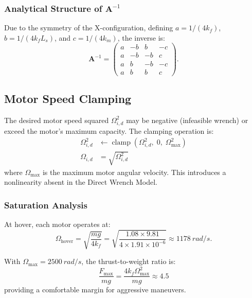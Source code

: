 \documentclass[journal]{IEEEtran}
\newcommand{\A}{\mathbf{A}}
\newcommand{\clamp}{\operatorname{clamp}}
\begin{document}
\subsubsection{Analytical Structure of $\A^{-1}$}

Due to the symmetry of the X-configuration, defining $a = 1/(4k_f)$, $b = 1/(4k_f L_s)$, and $c = 1/(4k_m)$, the inverse is:
\begin{equation}
  \A^{-1} = \begin{pmatrix}
    a & -b &  b & -c \\
    a & -b & -b &  c \\
    a &  b & -b & -c \\
    a &  b &  b &  c
  \end{pmatrix}.
  \label{eq:A_inv}
\end{equation}

\subsection{Motor Speed Clamping}

The desired motor speed squared $\Omega_{i,d}^2$ may be negative (infeasible wrench) or exceed the motor's maximum capacity. The clamping operation is:
\begin{align}
  \Omega_{i,d}^2 &\leftarrow \clamp(\Omega_{i,d}^2, \; 0, \; \Omega_{\max}^2) \label{eq:clamp_sq} \\
  \Omega_{i,d}   &= \sqrt{\Omega_{i,d}^2} \label{eq:sqrt_omega}
\end{align}
where $\Omega_{\max}$ is the maximum motor angular velocity. This introduces a nonlinearity absent in the Direct Wrench Model.

\subsubsection{Saturation Analysis}

At hover, each motor operates at:
\begin{equation}
  \Omega_{\text{hover}} = \sqrt{\frac{mg}{4 k_f}} = \sqrt{\frac{1.08 \times 9.81}{4 \times 1.91 \times 10^{-6}}} \approx \SI{1178}{rad/s}.
  \label{eq:omega_hover}
\end{equation}

With $\Omega_{\max} = \SI{2500}{rad/s}$, the thrust-to-weight ratio is:
\begin{equation}
  \frac{F_{\max}}{mg} = \frac{4 k_f \Omega_{\max}^2}{mg} \approx 4.5
  \label{eq:thrust_weight}
\end{equation}
providing a comfortable margin for aggressive maneuvers.
\end{document}
